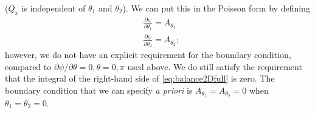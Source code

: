 \documentclass[11pt,reqno]{amsart}
\begin{document}
($Q_x$ is independent of $\theta_1$ and $\theta_2$). We can put this in the Poisson form by defining
\begin{subequations}
\label{eq:psiDef2}
\begin{align}
&\frac{\partial \psi}{\partial \theta_1} = A_{\theta_1} \\
&\frac{\partial \psi}{\partial \theta_2} = A_{\theta_2};
\end{align}
\end{subequations}
however, we do not have an explicit requirement for the boundary condition, compared to $\partial\psi/\partial\theta = 0, \theta = 0,\pi$ used above. We do still satisfy the requirement that the integral of the right-hand side of \eqref{eq:balance2Dfull} is zero. The boundary condition that we can specify \emph{a priori} is $A_{\theta_1} = A_{\theta_2} = 0$ when $\theta_1 = \theta_2 = 0$.

\end{document}
